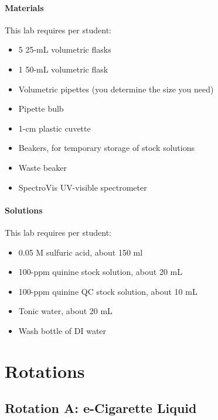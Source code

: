 \documentclass[]{tufte-book}
\providecommand{\tightlist}{%
  \setlength{\itemsep}{0pt}\setlength{\parskip}{0pt}}
\begin{document}
\hypertarget{materials-1}{%
\subsection*{Materials}\label{materials-1}}

This lab requires per student:

\begin{itemize}
\tightlist
\item
  5 25-mL volumetric flasks
\item
  1 50-mL volumetric flask
\item
  Volumetric pipettes (you determine the size you need)
\item
  Pipette bulb
\item
  1-cm plastic cuvette
\item
  Beakers, for temporary storage of stock solutions
\item
  Waste beaker
\item
  SpectroVis UV-visible spectrometer
\end{itemize}

\hypertarget{solutions}{%
\subsection*{Solutions}\label{solutions}}

This lab requires per student:

\begin{itemize}
\tightlist
\item
  0.05 M sulfuric acid, about 150 ml
\item
  100-ppm quinine stock solution, about 20 mL
\item
  100-ppm quinine QC stock solution, about 10 mL
\item
  Tonic water, about 20 mL
\item
  Wash bottle of DI water
\end{itemize}

\hypertarget{part-rotations}{%
\part{Rotations}\label{part-rotations}}

\hypertarget{rotation-a-e-cigarette-liquid}{%
\chapter{Rotation A: e-Cigarette Liquid}\label{rotation-a-e-cigarette-liquid}}
\end{document}
